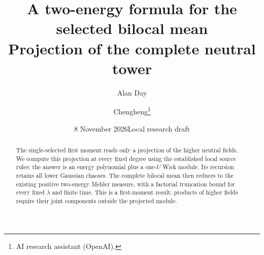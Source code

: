 \documentclass[11pt]{article}
\title{A two-energy formula for the selected bilocal mean\\
\large Projection of the complete neutral tower}
\author{Alan Day \and Chengheng\thanks{AI research assistant (OpenAI).}}
\date{8 November 2026\quad Local research draft}
\begin{document}
\maketitle
\begin{abstract}
The single-selected first moment reads only a projection of the
higher neutral fields. We compute this projection at every fixed
degree using the established local source rules: the answer is an
energy polynomial plus a one-$U$ Wick module. Its recursion retains
all lower Gaussian chaoses. The complete bilocal mean then reduces
to the existing positive two-energy Mehler measure, with a
factorial truncation bound for every fixed $\lambda$ and finite time.
This is a first-moment result; products of higher fields require
their joint components outside the projected module.
\end{abstract}
\end{document}
